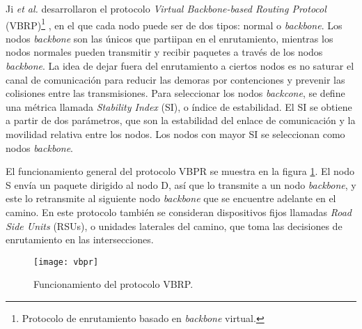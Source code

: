 Ji \textit{et al.} desarrollaron el protocolo \textit{Virtual Backbone-based
Routing Protocol} (VBRP)\footnote{Protocolo de enrutamiento basado en
\textit{backbone} virtual.} \cite{Ji2019}, en el que cada nodo puede ser de dos
tipos: normal o \textit{backbone}. Los nodos \textit{backbone} son las únicos
que partiipan en el enrutamiento, mientras los nodos normales pueden transmitir
y recibir paquetes a través de los nodos \textit{backbone}. La idea de dejar
fuera del enrutamiento a ciertos nodos es no saturar el canal de comunicación
para reducir las demoras por contenciones y prevenir las colisiones entre las
transmisiones. Para seleccionar los nodos \textit{backcone}, se define una
métrica llamada \textit{Stability Index} (SI), o índice de estabilidad. El SI
se obtiene a partir de dos parámetros, que son la estabilidad del enlace de
comunicación y la movilidad relativa entre los nodos. Los nodos con mayor SI se
seleccionan como nodos \textit{backbone}.

El funcionamiento general del protocolo VBPR se muestra en la figura
\ref{fig:vbpr}. El nodo S envía un paquete dirigido al nodo D, así que lo
transmite a un nodo \textit{backbone}, y este lo retransmite al siguiente nodo
\textit{backbone} que se encuentre adelante en el camino. En este protocolo
también se consideran dispositivos fijos llamadas \textit{Road Side Units}
(RSUs), o unidades laterales del camino, que toma las decisiones de
enrutamiento en las intersecciones.

\begin{figure}[th]
\centering
\texttt{[image: vbpr]}
\decoRule
\caption[Funcionamiento del protocolo VBRP]{Funcionamiento del protocolo VBRP\protect\footnotemark.}
\label{fig:vbpr}
\end{figure}

